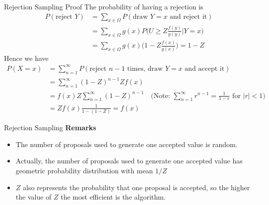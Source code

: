 \documentclass[8pt]{beamer}
\begin{document}
\begin{frame}{Rejection Sampling Proof}
The probability of having a rejection is 
\begin{align*}
P(\text{reject $Y$}) 
&= \sum_{x\in\Omega} P(\text{draw $Y = x$ and reject it}) \\
&= \sum_{x\in\Omega} g(x)P\biggl(U \geq Z\frac{f(y)}{g(y)} \biggl| Y = x \biggl)\\
&= \sum_{x\in\Omega} g(x) \biggl(1 - Z\frac{f(x)}{g(x)} \biggl) = 1- Z
\end{align*}
Hence we have 
\begin{align*}
P(X = x) 
&= \sum_{n=1}^{\infty} P(\text{reject $n-1$ times, draw $Y = x$ and accept it})\\
&= \sum_{n=1}^{\infty}(1-Z)^{n-1}Zf(x)\\
&= f(x)Z \sum_{n=1}^{\infty}(1-Z)^{n-1} \quad \biggl(\text{Note: $\sum_{n=1}^{\infty}r^{n-1} = \frac{1}{1-r}$ for $|r| < 1$}\biggl)\\
&= Zf(x)\frac{1}{1-(1-Z)} = f(x)
\end{align*}
\end{frame}

\begin{frame}{Rejection Sampling}
\textbf{Remarks}

\begin{itemize}
	\item The number of proposals used to generate one accepted value is random.
	\item Actually, the number of proposals used to generate one accepted value has geometric probability distribution with mean $1/Z$
	\item $Z$ also represents the probability that one proposal is accepted, so the higher the value of $Z$ the most efficient is the algorithm.
\end{itemize}
\end{frame}
\end{document}
